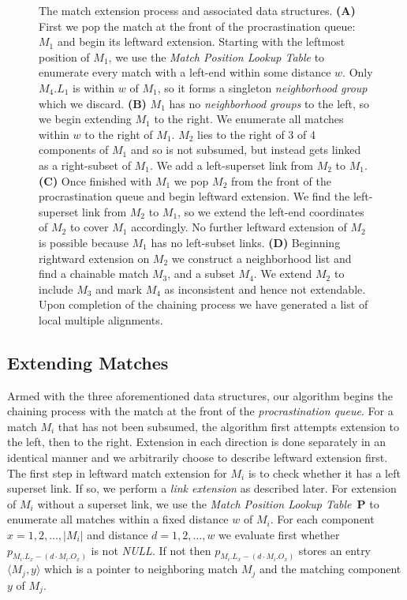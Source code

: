 \documentclass{llncs}
\begin{document}
\begin{figure}[t!]
\centering {} \caption{
 The match extension process and associated data
structures. \textbf{(A)} First we pop the match at the front of the
procrastination queue: $M_{1}$ and begin its leftward extension.
Starting with the leftmost position of $M_{1}$, we use the
\textit{Match Position Lookup Table} to enumerate every match with a
left-end within some distance $w$. Only $M_4.L_1$ is within $w$ of
$M_1$, so it forms a singleton \textit{neighborhood group} which we
discard. \textbf{(B)} $M_1$ has no \textit{neighborhood groups} to
the left, so we begin extending $M_1$ to the right.  We enumerate
all matches within $w$ to the right of $M_1$. $M_2$ lies to the
right of 3 of 4 components of $M_1$ and so is not subsumed, but
instead gets linked as a right-subset of $M_1$. We add a
left-superset link from $M_{2}$ to $M_1$. \textbf{(C)} Once finished
with $M_{1}$ we pop $M_{2}$ from the front of the procrastination
queue and begin leftward extension. We find the left-superset link
from $M_2$ to $M_1$, so we extend the left-end coordinates of
$M_{2}$ to cover $M_{1}$ accordingly. No further leftward extension
of $M_2$ is possible because $M_1$ has no left-subset links.
\textbf{(D)} Beginning rightward extension on $M_{2}$ we construct a
neighborhood list and find a chainable match $M_{3}$, and a subset
$M_{4}$. We extend $M_2$ to include $M_3$ and mark $M_4$ as
inconsistent and hence not extendable. Upon completion of the
chaining process we have generated a list of local multiple
alignments.} \label{fig:proc}
\end{figure}


\subsection{Extending Matches}\label{ssec:extend}
Armed with the three aforementioned data structures, our algorithm
begins the chaining process with the match at the front of the
\textit{procrastination queue}.  For a match $M_i$ that has not been
subsumed, the algorithm first attempts extension to the left, then
to the right. Extension in each direction is done separately in an
identical manner and we arbitrarily choose to describe leftward
extension first. The first step in leftward match extension for
$M_i$ is to check whether it has a left superset link. If so, we
perform a \textit{link extension} as described later. For extension
of $M_i$ without a superset link, we use the \textit{Match Position
Lookup Table}~$\mathbf{P}$ to enumerate all matches within a fixed
distance $w$ of $M_i$.  For each component $x=1, 2,\dots, |M_i|$ and
distance $d=1, 2,\dots,w$ we evaluate first whether $p_{M_i.L_x-(d
\cdot M_i.O_x)}$ is not \textit{NULL}. If not then $p_{M_i.L_x-(d
\cdot M_i.O_x)}$ stores an entry $\langle M_j, y \rangle$ which is a
pointer to neighboring match $M_j$ and the matching component $y$ of
$M_j$.
\end{document}

